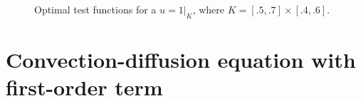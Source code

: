 \documentclass[11pt,onecolumn]{scrartcl}
\begin{document}
\begin{figure}
\centering
{}
\caption{Optimal test functions for a $u=\left.1\right|_K$, where $K = [.5,.7]\times[.4,.6]$.}
\end{figure}
\newpage
\section{Convection-diffusion equation with first-order term}
\end{document}
